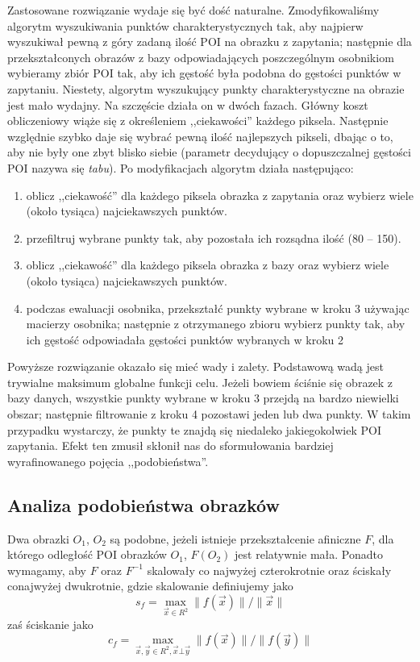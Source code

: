 \documentclass[a4paper,12pt,leqno]{article}
\begin{document}
Zastosowane rozwiązanie wydaje się być dość naturalne. Zmodyfikowaliśmy algorytm wyszukiwania punktów charakterystycznych tak, aby najpierw wyszukiwał pewną z góry zadaną ilość POI na 
obrazku z zapytania; następnie dla przekształconych obrazów z bazy odpowiadających poszczególnym osobnikiom wybieramy zbiór POI tak, aby ich gęstość była podobna do gęstości punktów w 
zapytaniu. Niestety, algorytm wyszukujący punkty charakterystyczne na obrazie jest mało wydajny. Na szczęście działa on w dwóch fazach. Główny koszt obliczeniowy wiąże się z 
określeniem ,,ciekawości'' każdego piksela. Następnie względnie szybko daje się wybrać pewną ilość najlepszych pikseli, dbając o to, aby nie były one zbyt blisko siebie (parametr decydujący o
dopuszczalnej gęstości POI nazywa się \textit{tabu}). Po modyfikacjach algorytm działa następująco:
\begin{enumerate}
 \item oblicz ,,ciekawość'' dla każdego piksela obrazka z zapytania oraz wybierz wiele (około tysiąca) najciekawszych punktów.
 \item przefiltruj wybrane punkty tak, aby pozostała ich rozsądna ilość (80 -- 150).
 \item oblicz ,,ciekawość'' dla każdego piksela obrazka z bazy oraz wybierz wiele (około tysiąca) najciekawszych punktów.
 \item podczas ewaluacji osobnika, przekształć punkty wybrane w kroku 3 używając macierzy osobnika;
       następnie z otrzymanego zbioru wybierz punkty tak, aby ich gęstość odpowiadała gęstości punktów wybranych w kroku 2
\end{enumerate}

Powyższe rozwiązanie okazało się mieć wady i zalety. Podstawową wadą jest trywialne maksimum globalne funkcji celu. Jeżeli bowiem ściśnie się obrazek z bazy danych, wszystkie punkty wybrane
w kroku 3 przejdą na bardzo niewielki obszar; następnie filtrowanie z kroku 4 pozostawi jeden lub dwa punkty. W takim przypadku wystarczy, że punkty te znajdą się niedaleko jakiegokolwiek
POI zapytania. Efekt ten zmusił skłonił nas do sformułowania bardziej wyrafinowanego pojęcia ,,podobieństwa''. 

\subsection{Analiza podobieństwa obrazków}
Dwa obrazki $O_1$, $O_2$ są podobne, jeżeli istnieje przekształcenie afiniczne $F$, dla którego odległość POI obrazków $O_1$, $F(O_2)$ jest relatywnie mała.
Ponadto wymagamy, aby $F$ oraz $F^{-1}$ skalowały co najwyżej czterokrotnie oraz ściskały conajwyżej dwukrotnie, gdzie skalowanie definiujemy jako
\[ s_f = \max_{\vec x \in R^2} \| f(\vec x) \| / \| \vec x \| \]
zaś ściskanie jako
\[ c_f = \max_{\vec x, \vec y \in R^2, \vec x \bot \vec y} \| f(\vec x) \| / \| f(\vec y) \| \]
\end{document}
